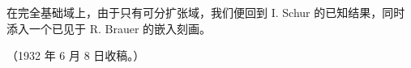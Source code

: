 在完全基础域上，由于只有可分扩张域，我们便回到 I. Schur 的已知结果，同时添入一个已见于 R. Brauer 的嵌入刻画。

\begin{center}
（1932 年 6 月 8 日收稿。）
\end{center}

\clearpage
\setcounter{footnote}{0}

